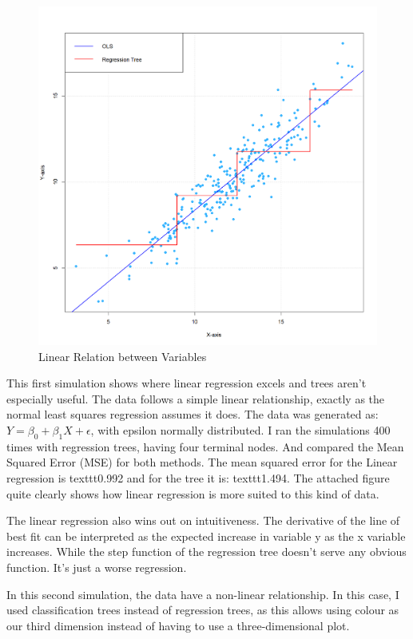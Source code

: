 \documentclass[12pt]{article}
\begin{document}
\begin{figure}
    \centering
    \includegraphics[scale=0.25]{OLS vs Tree.png}
    \caption{Linear Relation between Variables}
\end{figure}

This first simulation shows where linear regression excels and trees aren't especially useful. The data follows a simple linear relationship, exactly as the normal least squares regression assumes it does. The data was generated as: $Y = \beta_0 + \beta_1X + \epsilon$, with epsilon normally distributed. I ran the simulations 400 times with regression trees, having four terminal nodes. And compared the Mean Squared Error (MSE) for both methods. The mean squared error for the Linear regression is texttt{0.992} and for the tree it is: texttt{1.494}. The attached figure quite clearly shows how linear regression is more suited to this kind of data.

The linear regression also wins out on intuitiveness. The derivative of the line of best fit can be interpreted as the expected increase in variable y as the x variable increases. While the step function of the regression tree doesn't serve any obvious function. It's just a worse regression.

In this second simulation, the data have a non-linear relationship. In this case, I used classification trees instead of regression trees, as this allows using colour as our third dimension instead of having to use a three-dimensional plot.
\end{document}
